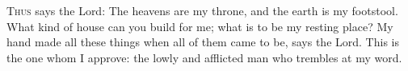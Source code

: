
\lettrine{T}{hus} says the Lord:
The heavens are my throne,
   and the earth is my footstool.
What kind of house can you build for me;
   what is to be my resting place?
My hand made all these things
   when all of them came to be, says the Lord.
This is the one whom I approve:
   the lowly and afflicted man who trembles at my word.